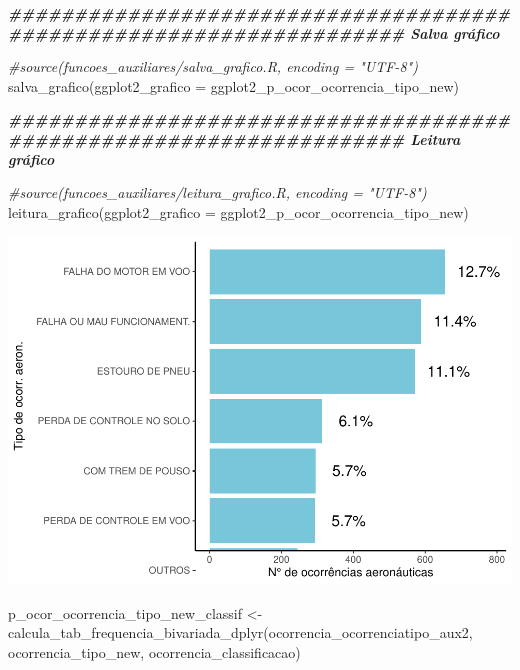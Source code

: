 \documentclass[
]{article}
\newenvironment{Shaded}{\begin{snugshade}}{\end{snugshade}}
\newcommand{\AttributeTok}[1]{\textcolor[rgb]{0.77,0.63,0.00}{#1}}
\newcommand{\CommentTok}[1]{\textcolor[rgb]{0.56,0.35,0.01}{\textit{#1}}}
\newcommand{\DocumentationTok}[1]{\textcolor[rgb]{0.56,0.35,0.01}{\textbf{\textit{#1}}}}
\newcommand{\FunctionTok}[1]{\textcolor[rgb]{0.00,0.00,0.00}{#1}}
\newcommand{\NormalTok}[1]{#1}
\newcommand{\OtherTok}[1]{\textcolor[rgb]{0.56,0.35,0.01}{#1}}
\newcommand{\StringTok}[1]{\textcolor[rgb]{0.31,0.60,0.02}{#1}}
\begin{document}
\begin{Shaded}
\begin{Highlighting}[]
\DocumentationTok{\#\#\#\#\#\#\#\#\#\#\#\#\#\#\#\#\#\#\#\#\#\#\#\#\#\#\#\#\#\#\#\#\#\#\#\#\#\#\#\#\#\#\#\#\#\#\#\#\#\#\#\#\#\#\#\#\#\#\#\#\#\#\#\#\#\#\#\# Salva gráfico}

\CommentTok{\#source(\textquotesingle{}funcoes\_auxiliares/salva\_grafico.R\textquotesingle{}, encoding = "UTF{-}8")}
\FunctionTok{salva\_grafico}\NormalTok{(}\AttributeTok{ggplot2\_grafico =}\NormalTok{ ggplot2\_p\_ocor\_ocorrencia\_tipo\_new)}

\DocumentationTok{\#\#\#\#\#\#\#\#\#\#\#\#\#\#\#\#\#\#\#\#\#\#\#\#\#\#\#\#\#\#\#\#\#\#\#\#\#\#\#\#\#\#\#\#\#\#\#\#\#\#\#\#\#\#\#\#\#\#\#\#\#\#\#\#\#\#\#\# Leitura gráfico}

\CommentTok{\#source(\textquotesingle{}funcoes\_auxiliares/leitura\_grafico.R\textquotesingle{}, encoding = "UTF{-}8")}
\FunctionTok{leitura\_grafico}\NormalTok{(}\AttributeTok{ggplot2\_grafico =}\NormalTok{ ggplot2\_p\_ocor\_ocorrencia\_tipo\_new)}
\end{Highlighting}
\end{Shaded}

\begin{center}\includegraphics{4.Relatorio/pdf/index_files/figure-latex/unnamed-chunk-43-1} \end{center}

\begin{Shaded}
\begin{Highlighting}[]
\NormalTok{p\_ocor\_ocorrencia\_tipo\_new\_classif }\OtherTok{\textless{}{-}} \FunctionTok{calcula\_tab\_frequencia\_bivariada\_dplyr}\NormalTok{(ocorrencia\_ocorrenciatipo\_aux2,}
                                                             \StringTok{\textasciigrave{}}\AttributeTok{ocorrencia\_tipo\_new}\StringTok{\textasciigrave{}}\NormalTok{,}
                                                             \StringTok{\textasciigrave{}}\AttributeTok{ocorrencia\_classificacao}\StringTok{\textasciigrave{}}\NormalTok{)}
\end{Highlighting}
\end{Shaded}
\end{document}
